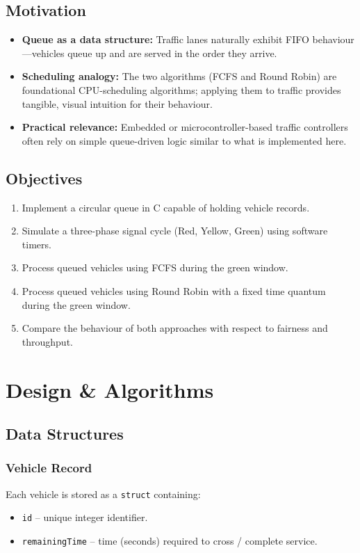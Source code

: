 \documentclass[12pt,a4paper]{article}
\begin{document}
\subsection{Motivation}
\begin{itemize}[leftmargin=1.5cm]
    \item \textbf{Queue as a data structure:} Traffic lanes naturally exhibit FIFO behaviour—vehicles queue up and are served in the order they arrive.
    \item \textbf{Scheduling analogy:} The two algorithms (FCFS and Round Robin) are foundational CPU-scheduling algorithms; applying them to traffic provides tangible, visual intuition for their behaviour.
    \item \textbf{Practical relevance:} Embedded or microcontroller-based traffic controllers often rely on simple queue-driven logic similar to what is implemented here.
\end{itemize}

\subsection{Objectives}
\begin{enumerate}[leftmargin=1.5cm]
    \item Implement a circular queue in C capable of holding vehicle records.
    \item Simulate a three-phase signal cycle (Red, Yellow, Green) using software timers.
    \item Process queued vehicles using FCFS during the green window.
    \item Process queued vehicles using Round Robin with a fixed time quantum during the green window.
    \item Compare the behaviour of both approaches with respect to fairness and throughput.
\end{enumerate}

\newpage

\section{Design \& Algorithms}

\subsection{Data Structures}

\subsubsection{Vehicle Record}
Each vehicle is stored as a \texttt{struct} containing:
\begin{itemize}
    \item \texttt{id} -- unique integer identifier.
    \item \texttt{remainingTime} -- time (seconds) required to cross / complete service.
\end{itemize}
\end{document}
